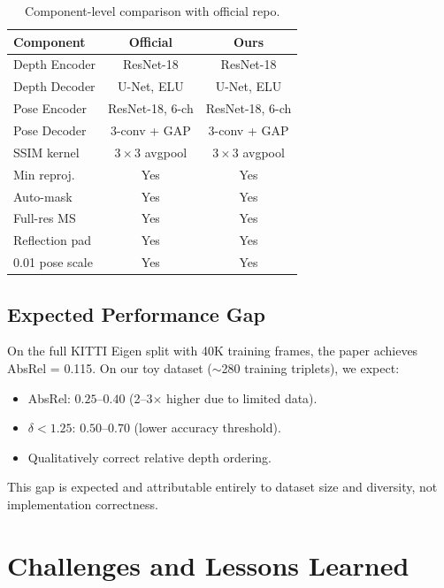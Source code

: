 \documentclass[10pt, a4paper, twocolumn]{article}
\begin{document}
\begin{table}[H]
\centering
\caption{Component-level comparison with official repo.}
\label{tab:comparison}
\begin{tabular}{@{}lcc@{}}
\toprule
\textbf{Component} & \textbf{Official} & \textbf{Ours} \\
\midrule
Depth Encoder & ResNet-18 & ResNet-18 \\
Depth Decoder & U-Net, ELU & U-Net, ELU \\
Pose Encoder & ResNet-18, 6-ch & ResNet-18, 6-ch \\
Pose Decoder & 3-conv + GAP & 3-conv + GAP \\
SSIM kernel & $3\times3$ avgpool & $3\times3$ avgpool \\
Min reproj. & Yes & Yes \\
Auto-mask & Yes & Yes \\
Full-res MS & Yes & Yes \\
Reflection pad & Yes & Yes \\
0.01 pose scale & Yes & Yes \\
\bottomrule
\end{tabular}
\end{table}

\subsection{Expected Performance Gap}

On the full KITTI Eigen split with 40K training frames, the paper achieves AbsRel = 0.115. On our toy dataset ($\sim$280 training triplets), we expect:
\begin{itemize}[noitemsep]
    \item AbsRel: $0.25$--$0.40$ (2--3$\times$ higher due to limited data).
    \item $\delta < 1.25$: $0.50$--$0.70$ (lower accuracy threshold).
    \item Qualitatively correct relative depth ordering.
\end{itemize}

This gap is expected and attributable entirely to dataset size and diversity, not implementation correctness.

\section{Challenges and Lessons Learned}
\label{sec:challenges}
\end{document}
